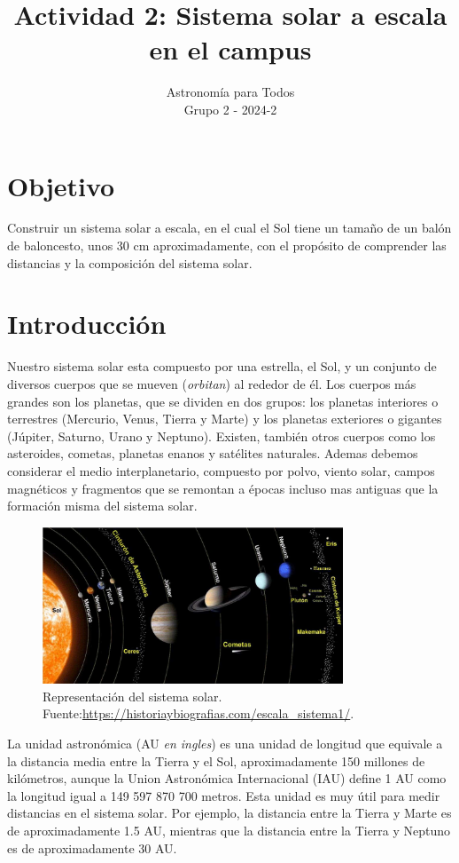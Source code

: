 \documentclass[12pt]{article}
\title{Actividad 2: Sistema solar a escala en el campus}
\author{Astronomía para Todos \\ Grupo 2 - 2024-2}
\date{}
\begin{document}
\maketitle

\section*{Objetivo}

Construir un sistema solar a escala, en el cual el Sol tiene un tamaño de un balón de baloncesto, unos 30 cm aproximadamente, con el propósito de comprender las distancias y la composición del sistema solar.

\section{Introducción}

Nuestro sistema solar esta compuesto por una estrella, el Sol, y un conjunto de diversos cuerpos que se mueven (\textit{orbitan}) al rededor de él. Los cuerpos más grandes son los planetas, que se dividen en dos grupos: los planetas interiores o terrestres (Mercurio, Venus, Tierra y Marte) y los planetas exteriores o gigantes (Júpiter, Saturno, Urano y Neptuno). Existen, también otros cuerpos como los asteroides, cometas, planetas enanos y satélites naturales. Ademas debemos considerar el medio interplanetario, compuesto por polvo, viento solar, campos magnéticos y fragmentos que se remontan a épocas incluso mas antiguas que la formación misma del sistema solar.
\begin{figure}[h]
    \centering
    \includegraphics[width=0.8\textwidth]{images/sistema-solar.jpg}
    \caption{Representación del sistema solar.\\Fuente:\url{https://historiaybiografias.com/escala_sistema1/}.}
\end{figure}

La unidad astronómica (AU \textit{en ingles}) es una unidad de longitud que equivale a la distancia media entre la Tierra y el Sol, aproximadamente 150 millones de kilómetros, aunque la Union Astronómica Internacional (IAU) define 1 AU como la longitud igual a 149 597 870 700 metros.   Esta unidad es muy útil para medir distancias en el sistema solar. Por ejemplo, la distancia entre la Tierra y Marte es de aproximadamente 1.5 AU, mientras que la distancia entre la Tierra y Neptuno es de aproximadamente 30 AU.
\end{document}
